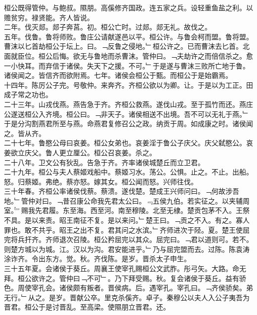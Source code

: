 \documentclass{zhvt-classic}
\begin{document}
\hspace*{2em}桓公既得管仲。与鲍叔。隰朋。高傒修齐国政。连五家之兵。设轻重鱼盐之利。以赡贫穷。禄贤能。齐人皆说。\\
\hspace*{2em}二年。伐灭郯。郯子奔莒。初。桓公亡时。过郯。郯无礼。故伐之。\\
\hspace*{2em}五年。伐鲁。鲁将师败。鲁庄公请献遂邑以平。桓公许。与鲁会柯而盟。鲁将盟。曹沫以匕首劫桓公于坛上。曰。﹁反鲁之侵地。﹂桓公许之。已而曹沫去匕首。北面就臣位。桓公后悔。欲无与鲁地而杀曹沫。管仲曰。﹁夫劫许之而倍信杀之。愈一小快耳。而弃信于诸侯。失天下之援。不可。﹂于是遂与曹沫三败所亡地于鲁。诸侯闻之。皆信齐而欲附焉。七年。诸侯会桓公于甄。而桓公于是始霸焉。\\
\hspace*{2em}十四年。陈厉公子完。号敬仲。来奔齐。齐桓公欲以为卿。让。于是以为工正。田成子常之功也。\\
\hspace*{2em}二十三年。山戎伐燕。燕告急于齐。齐桓公救燕。遂伐山戎。至于孤竹而还。燕庄公遂送桓公入齐境。桓公曰。﹁非天子。诸侯相送不出境。吾不可以无礼于燕。﹂于是分沟割燕君所至与燕。命燕君复修召公之政。纳贡于周。如成康之时。诸侯闻之。皆从齐。\\
\hspace*{2em}二十七年。鲁愍公母曰哀姜。桓公女弟也。哀姜淫于鲁公子庆父。庆父弑愍公。哀姜欲立庆父。鲁人更立厘公。桓公召哀姜。杀之。\\
\hspace*{2em}二十八年。卫文公有狄乱。告急于齐。齐率诸侯城楚丘而立卫君。\\
\hspace*{2em}二十九年。桓公与夫人蔡姬戏船中。蔡姬习水。荡公。公惧。止之。不止。出船。怒。归蔡姬。弗绝。蔡亦怒。嫁其女。桓公闻而怒。兴师往伐。\\
\hspace*{2em}三十年春。齐桓公率诸侯伐蔡。蔡溃。遂伐楚。楚成王兴师问曰。﹁何故涉吾地。﹂管仲对曰。﹁昔召康公命我先君太公曰。﹃五侯九伯。若实征之。以夹辅周室。﹄赐我先君履。东至海。西至河。南至穆陵。北至无棣。楚贡包茅不入。王祭不具。是以来责。昭王南征不复。是以来问。﹂楚王曰。﹁贡之不入。有之。寡人罪也。敢不共乎。昭王之出不复。君其问之水滨。﹂齐师进次于陉。夏。楚王使屈完将兵扞齐。齐师退次召陵。桓公矜屈完以其众。屈完曰。﹁君以道则可。若不。则楚方城以为城。江。汉以为沟。君安能进乎。﹂乃与屈完盟而去。过陈。陈袁涛涂诈齐。令出东方。觉。秋。齐伐陈。是岁。晋杀太子申生。\\
\hspace*{2em}三十五年夏。会诸侯于葵丘。周襄王使宰孔赐桓公文武胙。彤弓矢。大路。命无拜。桓公欲许之。管仲曰﹁不可﹂。乃下拜受赐。秋。复会诸侯于葵丘。益有骄色。周使宰孔会。诸侯颇有叛者。晋侯病。后。遇宰孔。宰孔曰。﹁齐侯骄矣。弟无行。﹂从之。是岁。晋献公卒。里克杀傒齐。卓子。秦穆公以夫人入公子夷吾为晋君。桓公于是讨晋乱。至高梁。使隰朋立晋君。还。\\
\end{document}
